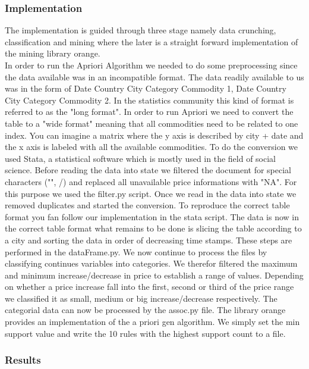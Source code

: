 \subsubsection{Implementation}

The implementation is guided through three stage namely data crunching, classification and  mining where the later is a straight forward implementation of the mining library orange. \\



In order to run the Apriori Algorithm we needed to do some preprocessing since the data available was in an incompatible format. The data readily available to us was in the form 
of Date Country City Category Commodity 1, Date Country City Category Commodity 2. In the statistics community this kind of format is referred to as the "long format". In order to run Apriori we need to convert the table to a "wide format" meaning that all commodities need to be related to one index. You can imagine a matrix where the y axis is described by city + date and the x axis is labeled with all the available commodities. To do the conversion we used Stata, a statistical software which is mostly used in the field of social science. Before reading the data into state we filtered the document for special characters ("", /) and replaced all unavailable price informations with "NA". For this purpose we used the filter.py script. Once we read in the data into state we removed duplicates and started the conversion. To reproduce the correct table format you fan follow our implementation in the stata script.  The data is now in the correct table format what remains to be done is slicing the table according to a city and sorting the data in order of decreasing time stamps. These steps are performed in the dataFrame.py. We now continue to process the files by classifying continues variables into categories. We therefor filtered the maximum and minimum increase/decrease in price to establish a range of values. Depending on whether a price increase fall into the first, second or third of the price range we classified it as small, medium or big increase/decrease respectively. The categorial data can now be processed by the assoc.py file. The library orange provides an implementation of the a priori gen algorithm. We simply set the min support value and write the 10 rules with the highest support count to a file. 

\subsubsection{Results}

